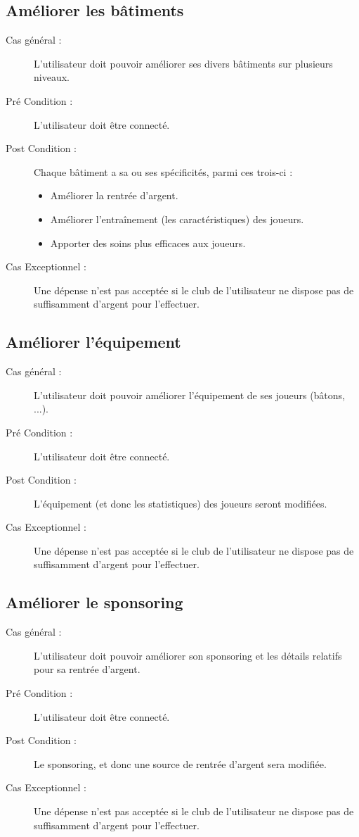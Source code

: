 \documentclass[a4paper]{report}
\begin{document}
\subsection{Améliorer les bâtiments}
\begin{description}
    \item[Cas général :] L'\gls{utilisateur} doit pouvoir améliorer ses divers bâtiments sur plusieurs niveaux. 
    \item[Pré Condition  :] L'\gls{utilisateur} doit être connecté.
    \item[Post Condition :] Chaque bâtiment a sa ou ses spécificités, parmi ces trois-ci :
        \begin{itemize}
            \item Améliorer la rentrée d'argent.
            \item  Améliorer l'entraînement (les caractéristiques) des \glspl{joueur}.
            \item  Apporter des soins plus efficaces aux \glspl{joueur}.
        \end{itemize}
    \item[Cas Exceptionnel :] Une dépense n'est pas acceptée si le \gls{club} de l'\gls{utilisateur} ne dispose pas de suffisamment d'argent pour l'effectuer.
\end{description}

\subsection{Améliorer l'équipement}
\begin{description}
    \item[Cas général :] L'\gls{utilisateur} doit pouvoir améliorer l'équipement de ses \glspl{joueur} (bâtons, ...).
    \item[Pré Condition  :] L'\gls{utilisateur} doit être connecté.
    \item[Post Condition :] L'équipement (et donc les statistiques) des \glspl{joueur} seront modifiées.
    \item[Cas Exceptionnel :] Une dépense n'est pas acceptée si le \gls{club} de l'\gls{utilisateur} ne dispose pas de suffisamment d'argent pour l'effectuer.
\end{description}

\subsection{Améliorer le sponsoring}
\begin{description}
    \item[Cas général :] L'\gls{utilisateur} doit pouvoir améliorer son sponsoring et les détails relatifs pour sa rentrée d'argent.
    \item[Pré Condition  :] L'\gls{utilisateur} doit être connecté.
    \item[Post Condition :] Le sponsoring, et donc une source de rentrée d'argent sera modifiée.
    \item[Cas Exceptionnel :] Une dépense n'est pas acceptée si le \gls{club} de l'\gls{utilisateur} ne dispose pas de suffisamment d'argent pour l'effectuer.
\end{description}
\end{document}
